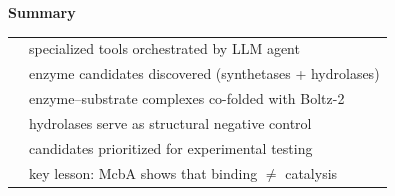\documentclass[aspectratio=169, 11pt]{beamer}
\begin{document}
{
\begin{frame}[plain]
\vfill
\begin{center}
{\Large\bfseries\color{white} Summary}\\[16pt]
{\normalsize\color{lightblue}
\begin{tabular}{rl}
\color{accentorange}{18} & \color{white} specialized tools orchestrated by LLM agent \\[6pt]
\color{accentorange}{27+28} & \color{white} enzyme candidates discovered (synthetases + hydrolases) \\[6pt]
\color{accentorange}{122} & \color{white} enzyme--substrate complexes co-folded with Boltz-2 \\[6pt]
\color{accentorange}{93} & \color{white} hydrolases serve as structural negative control \\[6pt]
\color{accentorange}{5} & \color{white} candidates prioritized for experimental testing \\[6pt]
\color{accentorange}{1} & \color{white} key lesson: McbA shows that binding $\neq$ catalysis \\[6pt]
\end{tabular}
}
\end{center}
\vfill
\end{frame}
}
\end{document}
